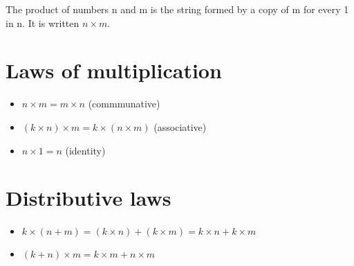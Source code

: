 

\begin{definition}[Product]
    The product of numbers n and m is the string formed by a copy of m for every
    1 in n. It is written \( n \times m \).
\end{definition}

\section*{Laws of multiplication}
\begin{itemize}
    \item \( n \times m = m \times n  \) (commmunative)
    \item \((k \times n) \times m = k \times (n \times m) \) (associative)
    \item \( n \times 1 = n  \) (identity)
\end{itemize}

\section*{Distributive laws}
\begin{itemize}
    \item \( k \times (n + m) = (k \times n) + (k \times m) = k \times n + k \times m \)
    \item \( (k + n) \times m = k \times m + n \times m \)
\end{itemize}
